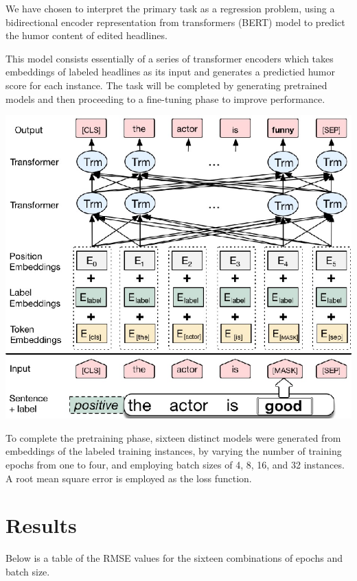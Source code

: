 \documentclass{article}
\begin{document}
We have chosen to interpret the primary task as a regression problem, using a bidirectional encoder representation from transformers (BERT) model to predict the humor content of edited headlines.

This model \cite{DBLP:journals/corr/abs-1810-04805} consists essentially of a series of transformer encoders which takes embeddings of labeled headlines as its input and generates a predictied humor score for each instance. The task will be completed by generating pretrained models and then proceeding to a fine-tuning phase to improve performance.

\vspace{1cm}
\includegraphics[scale=0.25]{bert-architecture.png}
\vspace{1cm}

To complete the pretraining phase, sixteen distinct models were generated from embeddings of the labeled training instances, by varying the number of training epochs from one to four, and employing batch sizes of 4, 8, 16, and 32 instances. A root mean square error is employed as the loss function.

\section{Results}

Below is a table of the RMSE values for the sixteen combinations of epochs and batch size.
\end{document}
